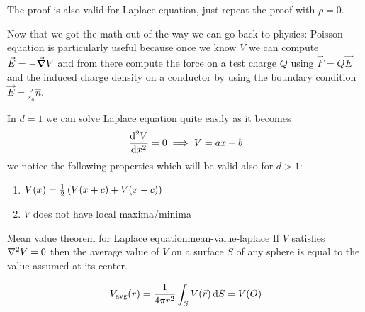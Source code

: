 \documentclass[12pt]{extarticle}
\begin{document}
\begin{corollary}{}{}
	The proof is also valid for Laplace equation, just repeat the proof with $\rho = 0$.
\end{corollary}

Now that we got the math out of the way we can go back to physics:
Poisson equation is particularly useful because once we know $V$ we can compute $\vec E = - \grad V$ and from there compute the force on a test charge $Q$ using $\vec F = Q \vec E$ and the induced charge density on a conductor by using the boundary condition $\vec E = \frac{\sigma}{\varepsilon_0} \hat n$.

In $d = 1$ we can solve Laplace equation quite easily as it becomes
\begin{equation}
	\dv[2]{V}{x} = 0 \implies V = ax + b
\end{equation}
we notice the following properties which will be valid also for $d \gt 1$:
\begin{enumerate}
	\item $V(x) = \frac{1}{2} \left( V(x +c) + V(x-c) \right)$
	\item $V$ does not have local maxima/minima
\end{enumerate}

\begin{theorem}{Mean value theorem for Laplace equation}{mean-value-laplace}
	If $V$ satisfies $\laplacian V = 0$ then the average value of $V$ on a surface $S$ of any sphere is equal to the value assumed at its center.

	\begin{equation}
		V_\text{avg} (r) = \frac{1}{4 \pi r^2} \int_S V(\vec r)\dd{S} = V(O)
	\end{equation}
\end{theorem}
\end{document}
